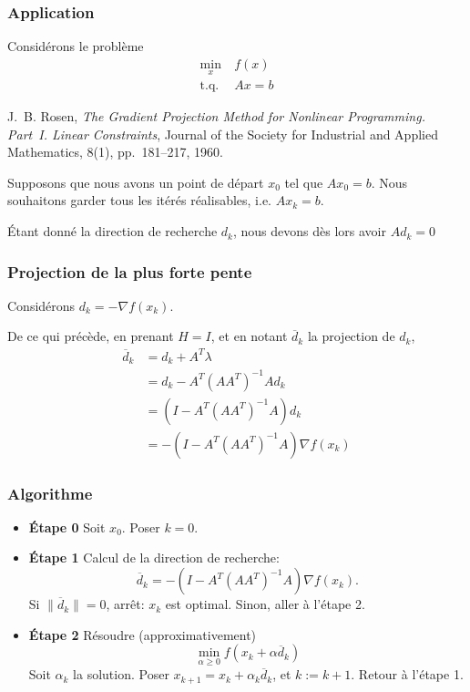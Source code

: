 \documentclass[usepdftitle=false,aspectratio=169]{beamer}
\begin{document}
\begin{frame}
	\frametitle{Application}
	
	Considérons le problème
	\begin{align*}
	\min_x \ & f(x) \\
	\mbox{t.q. } & Ax = b
	\end{align*}
	
	\mbox{}
	
	J.~B. Rosen, \textit{The Gradient Projection Method for Nonlinear Programming. Part~I. Linear Constraints}, Journal of the Society for Industrial and Applied Mathematics, 8(1), pp.~181--217, 1960.
	
	\mbox{}
	
	Supposons que nous avons un point de départ $x_0$ tel que $Ax_0 = b$.
	Nous souhaitons garder tous les itérés réalisables, i.e. $Ax_k = b$.
	
	\mbox{}
	
	Étant donné la direction de recherche $d_k$, nous devons dès lors avoir $Ad_k = 0$
	
\end{frame}

\begin{frame}
	\frametitle{Projection de la plus forte pente}
	
	Considérons $d_k = -\nabla f(x_k)$.
	
	\mbox{}
	
	De ce qui précède, en prenant $H = I$, et en notant $\overline{d}_k$ la projection de $d_k$,
	\begin{align*}
	\overline{d}_k &= d_k + A^T\lambda \\
	&= d_k - A^T(AA^T)^{-1}Ad_k \\
	&= \left(I-A^T(AA^T)^{-1}A\right)d_k \\
	&= -\left(I-A^T(AA^T)^{-1}A\right)\nabla f(x_k) 
	\end{align*}
	
\end{frame}

\begin{frame}
	\frametitle{Algorithme}
	
	\begin{itemize}
		\item 
		\textbf{Étape 0} Soit $x_0$. Poser $k = 0$.
		\item 
		\textbf{Étape 1}
		Calcul de la direction de recherche:
		$$
		\overline{d}_k = -\left(I-A^T(AA^T)^{-1}A\right)\nabla f(x_k).
		$$
		Si $\| \overline{d}_k \| = 0$, arrêt: $x_k$ est optimal.
		Sinon, aller à l'étape 2.
		\item 
		\textbf{Étape 2}
		Résoudre (approximativement)
		$$
		\min_{\alpha \geq 0} f(x_k+\alpha \overline{d}_k)
		$$
		Soit $\alpha_k$ la solution. Poser $x_{k+1} = x_k + \alpha_k \overline{d}_k$, et $k := k + 1$. Retour à l'étape 1.
	\end{itemize}
	
\end{frame}
\end{document}
